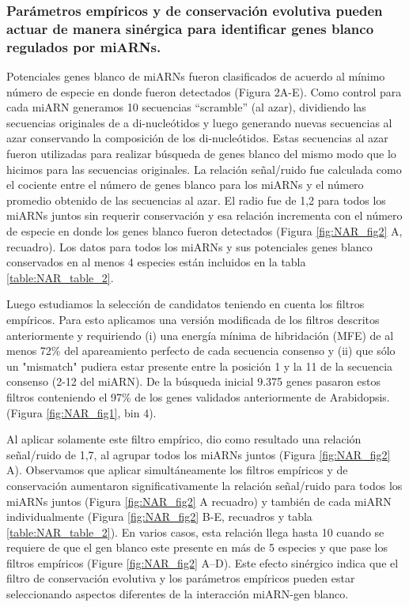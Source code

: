 \subsubsection{Parámetros empíricos y de conservación evolutiva pueden actuar de manera sinérgica para identificar genes blanco regulados por miARNs.}
Potenciales genes blanco de miARNs fueron clasificados de acuerdo al mínimo número de especie en donde fueron detectados (Figura 2A-E).
Como control para cada miARN generamos 10 secuencias “scramble” (al azar), dividiendo las secuencias originales de a di-nucleótidos y luego generando nuevas secuencias al azar conservando la composición de los di-nucleótidos.
Estas secuencias al azar fueron utilizadas para realizar búsqueda de genes blanco del mismo modo que lo hicimos para las secuencias originales.
La relación señal/ruido fue calculada como el cociente entre el número de genes blanco para los miARNs y el número promedio obtenido de las secuencias al azar.
El radio fue de 1,2 para todos los miARNs juntos sin requerir conservación y esa relación incrementa con el número de especie en donde los genes blanco fueron detectados (Figura \ref{fig:NAR_fig2} A, recuadro). 
Los datos para todos los miARNs y sus potenciales genes blanco conservados en al menos 4 especies están incluidos en la tabla \ref{table:NAR_table_2}.

Luego estudiamos la selección de candidatos teniendo en cuenta los filtros empíricos.
Para esto aplicamos una versión modificada de los filtros descritos anteriormente y requiriendo (i) una energía mínima de hibridación (MFE) de al menos 72\% del apareamiento perfecto de cada secuencia consenso y (ii)  que sólo un "mismatch" pudiera estar presente entre la posición 1 y la 11 de la secuencia consenso (2-12 del miARN).
De la búsqueda inicial 9.375 genes pasaron estos filtros conteniendo el 97\% de los genes validados anteriormente de Arabidopsis. (Figura \ref{fig:NAR_fig1}, bin 4). 

Al aplicar solamente este filtro empírico, dio como resultado una relación señal/ruido de 1,7, al agrupar todos los miARNs juntos (Figura \ref{fig:NAR_fig2} A).
Observamos que aplicar simultáneamente los filtros empíricos y de conservación aumentaron significativamente la relación señal/ruido para todos los miARNs juntos (Figura \ref{fig:NAR_fig2} A recuadro) y también de cada miARN individualmente (Figura \ref{fig:NAR_fig2} B-E, recuadros y tabla \ref{table:NAR_table_2}).
En varios casos, esta relación llega hasta 10 cuando se requiere de que el gen blanco este presente en más de 5 especies y que pase los filtros empíricos (Figure \ref{fig:NAR_fig2} A–D).
Este efecto sinérgico indica que el filtro de conservación evolutiva y los parámetros empíricos pueden estar seleccionando aspectos diferentes de la interacción miARN-gen blanco.

